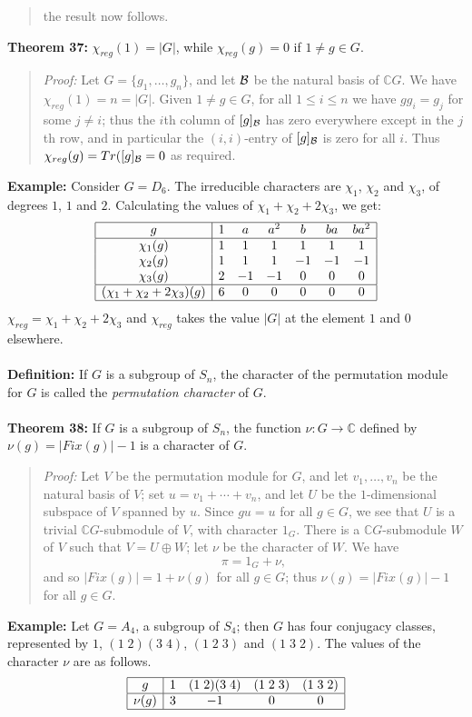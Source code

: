 {\begin{quote}
the result now follows.
\end{quote}
{\bf Theorem 37:} $\chi_{reg}(1)=|G|$, while $\chi_{reg}(g)=0$ if
$1\neq g \in G$.
\begin{quote}
\emph{Proof:}
Let $G=\{g_1,\dots,g_n\}$, and let ${\cal B}$ be the natural basis of ${\mathbb C}G$.
We have $\chi_{reg}(1)=n=|G|$. Given $1\neq g\in G$, for all
$1\leq i\leq n$ we have $gg_i=g_j$ for some $j\neq i$; thus the $i$th column of
$[g]_{\cal B}$ has zero everywhere except in the $j$th row, and in particular the
$(i,i)$-entry of $[g]_{\cal B}$ is zero for all $i$. Thus
$\chi_{reg}(g)=Tr([g]_{\cal B}=0$ as required.
\end{quote}
{\bf Example:} 
Consider $G=D_6$. The irreducible characters are
$\chi_1$, $\chi_2$ and $\chi_3$, of degrees $1$, $1$ and $2$.
Calculating the values of $\chi_1+\chi_2+2\chi_3$, we get:
$$
\begin{array}{|c|cccccc|}
\hline
g&1&a&a^2&b&ba&ba^2\\
\hline
\chi_1(g)&1&1&1&1&1&1\\
\chi_2(g)&1&1&1&-1&-1&-1\\
\chi_3(g)&2&-1&-1&0&0&0\\
\hline
(\chi_1+\chi_2+2\chi_3)(g)&6&0&0&0&0&0\\
\hline
\end{array}
$$
$\chi_{reg}=\chi_1+\chi_2+2\chi_3$ and
$\chi_{reg}$ takes the value $|G|$ at the element $1$ and $0$ elsewhere.
\\
\\
{\bf Definition:} If $G$ is a subgroup of $S_n$, the character of the
permutation module for $G$ is called the \emph{permutation character} of $G$.
\\
\\
{\bf Theorem 38:} If $G$ is a subgroup of $S_n$, the function
$\nu:G\rightarrow{\mathbb C}$ defined by $\nu(g)=|Fix(g)|-1$ is a character of $G$.
\begin{quote}
\emph{Proof:}
Let $V$ be the permutation module for $G$, and let $v_1,\dots,v_n$ be the
natural basis of $V$; set $u=v_1+\cdots+v_n$, and let $U$ be the
$1$-dimensional subspace of $V$ spanned by $u$. Since $gu=u$ for all $g\in G$,
we see that $U$ is a trivial ${\mathbb C}G$-submodule of $V$, with character $1_G$.
There is a ${\mathbb C}G$-submodule $W$ of $V$ such that $V=U\oplus W$;
let $\nu$ be the character of $W$. We have
$$\pi=1_G+\nu,$$
and so $|Fix(g)|=1+\nu(g)$ for all $g\in G$; thus $\nu(g)=|Fix(g)|-1$ for all
$g\in G$.
\end{quote}
{\bf Example:} Let $G=A_4$, a subgroup of $S_4$; then
$G$ has four conjugacy classes, represented by $1$, $(1\;2)(3\;4)$,
$(1\;2\;3)$ and $(1\;3\;2)$. The values of the character $\nu$ are as follows.
$$
\begin{array}{|c|cccc|}
\hline
g&1&(1\;2)(3\;4)&(1\;2\;3)&(1\;3\;2)\\
\hline
\nu(g)&3&-1&0&0\\
\hline
\end{array}
$$
}
